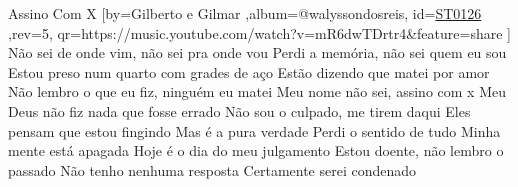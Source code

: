 \beginsong
{Assino Com X %
}[by={Gilberto e Gilmar %
},album={@walyssondosreis},
id={\href{https://music.youtube.com/watch?v=mR6dwTDrtr4&feature=share %
}{ST0126 %
}},rev={5}, %
qr={https://music.youtube.com/watch?v=mR6dwTDrtr4&feature=share %
}]
\beginverse
Não sei de onde vim, não sei pra onde vou
Perdi a memória, não sei quem eu sou
Estou preso num quarto com grades de aço
Estão dizendo que matei por amor
\endverse
\beginverse
Não lembro o que eu fiz, ninguém eu matei
Meu nome não sei, assino com x
Meu Deus não fiz nada que fosse errado
Não sou o culpado, me tirem daqui
\endverse
\beginchorus
Eles pensam que estou fingindo
Mas é a pura verdade
Perdi o sentido de tudo
Minha mente está apagada
Hoje é o dia do meu julgamento
Estou doente, não lembro o passado
Não tenho nenhuma resposta
Certamente serei condenado
\endchorus
{}
\vspace{4em} %
\begin{comment}
\lstset{basicstyle=\scriptsize\bf} %
\tab{Solo 1}
\begin{lstlisting}
E|-----------------------------------------------------|
B|-----------------------------------------------------|
G|-----------------------------------------------------|
D|-----------------------------------------------------|
A|-----------------------------------------------------|
E|-----------------------------------------------------|
\end{lstlisting}
\end{comment}
\begin{comment}

\color{drawChord}\gtab{\color{nameChord} X}{}%
\color{drawChord}\gtab{\color{nameChord} X}{}%
\color{drawChord}\gtab{\color{nameChord} X}{}%
\color{drawChord}\gtab{\color{nameChord} X}{}%

\end{comment}
